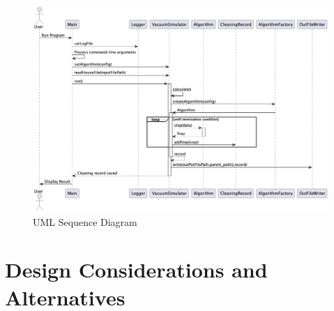 \documentclass{article}
\begin{document}
\begin{figure}[h!]
    \centering
    \includegraphics[width=\textwidth]{Diagrams/output_directory/sequence_diagram.png}
    \caption{UML Sequence Diagram}
    \label{fig:sequence-diagram}
\end{figure}

\section{Design Considerations and Alternatives}
\end{document}

